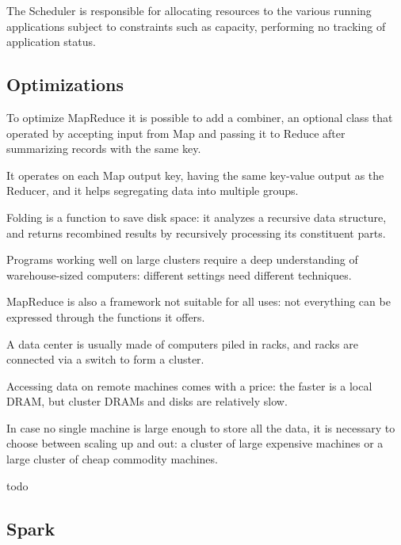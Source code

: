 The Scheduler is responsible for allocating resources to the various running applications subject to constraints such as capacity, performing no tracking of application status.

\subsection{Optimizations}
To optimize MapReduce it is possible to add a combiner, an optional class that operated by accepting input from Map and passing it to Reduce after summarizing records with the same key.

It operates on each Map output key, having the same key-value output as the Reducer, and it helps segregating data into multiple groups.

Folding is a function to save disk space: it analyzes a recursive data structure, and returns recombined results by recursively processing its constituent parts.

Programs working well on large clusters require a deep understanding of warehouse-sized computers: different settings need different techniques.

MapReduce is also a framework not suitable for all uses: not everything can be expressed through the functions it offers.

A data center is usually made of computers piled in racks, and racks are connected via a switch to form a cluster.

Accessing data on remote machines comes with a price: the faster is a local DRAM, but cluster DRAMs and disks are relatively slow. 

In case no single machine is large enough to store all the data, it is necessary to choose between scaling up and out: a cluster of large expensive machines or a large cluster of cheap commodity machines.

todo

\subsection{Spark}


